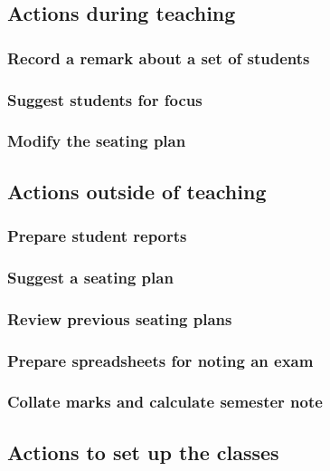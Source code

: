\documentclass[10pt]{article}
\begin{document}
\subsection{Actions during teaching}

\subsubsection{Record a remark about a set of students}

\subsubsection{Suggest students for focus}

\subsubsection{Modify the seating plan}
 
 
 
 
\subsection{Actions outside of teaching}
 
\subsubsection{Prepare student reports}

\subsubsection{Suggest a seating plan}

\subsubsection{Review previous seating plans}

\subsubsection{Prepare spreadsheets for noting an exam}

\subsubsection{Collate marks and calculate semester note}





\subsection{Actions to set up the classes}
 
\end{document}
